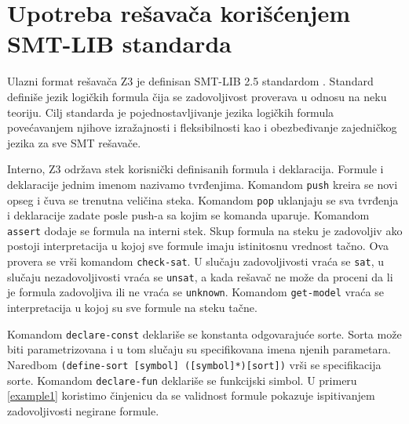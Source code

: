 \documentclass[12pt,oneside]{memoir}
\begin{document}
\section{Upotreba rešavača korišćenjem SMT-LIB standarda} \label{sec:num4}
Ulazni format rešavača Z3 je definisan SMT-LIB 2.5 standardom \cite{SMTLIB}. Standard definiše jezik logičkih formula čija se zadovoljivost proverava u odnosu na neku teoriju. Cilj standarda je pojednostavljivanje jezika logičkih formula povećavanjem njihove izražajnosti i fleksibilnosti kao i obezbeđivanje zajedničkog jezika za sve SMT rešavače. 
\par
Interno, Z3 održava stek korisnički definisanih formula i deklaracija. Formule i deklaracije jednim imenom nazivamo tvrđenjima. Komandom \texttt{push} kreira se novi opseg i čuva se trenutna veličina steka. Komandom \texttt{pop} uklanjaju se sva tvrđenja i deklaracije zadate posle push-a sa kojim se komanda uparuje. Komandom \texttt{assert} dodaje se formula na interni stek. Skup formula na steku je zadovoljiv ako postoji interpretacija u kojoj sve formule imaju istinitosnu vrednost tačno. Ova provera se vrši komandom \texttt{check-sat}. U slučaju zadovoljivosti vraća se \texttt{sat}, u slučaju nezadovoljivosti vraća se \texttt{unsat}, a kada rešavač ne može da proceni da li je formula zadovoljiva ili ne vraća se \texttt{unknown}. Komandom \texttt{get-model} vraća se interpretacija u kojoj su sve formule na steku tačne. 
\par

Komandom \texttt{declare-const} deklariše se konstanta odgovarajuće sorte. Sorta može biti parametrizovana i u tom slučaju su specifikovana imena njenih parametara. Naredbom \texttt{(define-sort [symbol] ([symbol]*)[sort])} vrši se specifikacija sorte.
Komandom \texttt{declare-fun} deklariše se funkcijski simbol. 
U primeru \ref{example1} koristimo činjenicu da se validnost formule pokazuje ispitivanjem zadovoljivosti negirane formule. 
\end{document}
